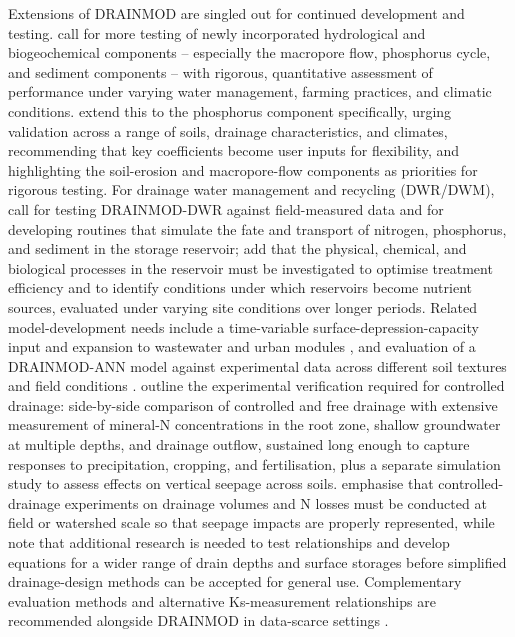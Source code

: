 \documentclass[11pt]{article}
\begin{document}
Extensions of DRAINMOD are singled out for continued development and testing.
\textcite{Askar2021b} call for more testing of newly incorporated hydrological
and biogeochemical components -- especially the macropore flow, phosphorus cycle,
and sediment components -- with rigorous, quantitative assessment of performance
under varying water management, farming practices, and climatic conditions.
\textcite{Askar2025} extend this to the phosphorus component specifically, urging
validation across a range of soils, drainage characteristics, and climates,
recommending that key coefficients become user inputs for flexibility, and
highlighting the soil-erosion and macropore-flow components as priorities for
rigorous testing. For drainage water management and recycling (DWR/DWM),
\textcite{Moursi2022} call for testing DRAINMOD-DWR against field-measured data
and for developing routines that simulate the fate and transport of nitrogen,
phosphorus, and sediment in the storage reservoir; \textcite{Moursi2023} add that
the physical, chemical, and biological processes in the reservoir must be
investigated to optimise treatment efficiency and to identify conditions under
which reservoirs become nutrient sources, evaluated under varying site conditions
over longer periods. Related model-development needs include a time-variable
surface-depression-capacity input and expansion to wastewater and urban modules
\parencite{Abduljaleel2023}, and evaluation of a DRAINMOD-ANN model against
experimental data across different soil textures and field conditions
\parencite{Awad2022}. \textcite{Youssef2018} outline the experimental verification
required for controlled drainage: side-by-side comparison of controlled and free
drainage with extensive measurement of mineral-N concentrations in the root zone,
shallow groundwater at multiple depths, and drainage outflow, sustained long
enough to capture responses to precipitation, cropping, and fertilisation, plus a
separate simulation study to assess effects on vertical seepage across soils.
\textcite{Skaggs2010} emphasise that controlled-drainage experiments on drainage
volumes and N losses must be conducted at field or watershed scale so that
seepage impacts are properly represented, while \textcite{Skaggs2006} note that
additional research is needed to test relationships and develop equations for a
wider range of drain depths and surface storages before simplified drainage-design
methods can be accepted for general use. Complementary evaluation methods and
alternative Ks-measurement relationships are recommended alongside DRAINMOD in
data-scarce settings \parencite{NabiSichani2012}.
\end{document}

